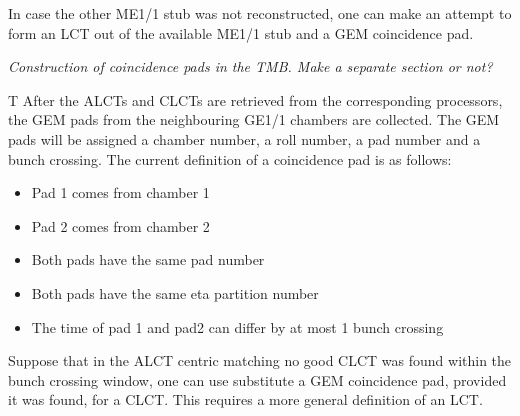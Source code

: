 In case the other ME1/1 stub was not reconstructed, one can make an attempt to form an LCT out of the available ME1/1 stub and a GEM coincidence pad.

\textit{Construction of coincidence pads in the TMB. Make a separate section or not?}


T
After the ALCTs and CLCTs are retrieved from the corresponding processors, the GEM pads from the neighbouring GE1/1 chambers are collected. The GEM pads will be assigned a chamber number, a roll number, a pad number and a bunch crossing. The current definition of a coincidence pad is as follows:
\begin{itemize}
\item Pad 1 comes from chamber 1
\item Pad 2 comes from chamber 2
\item Both pads have the same pad number
\item Both pads have the same eta partition number
\item The time of pad 1 and pad2 can differ by at most 1 bunch crossing
\end{itemize}


Suppose that in the ALCT centric matching no good CLCT was found within the bunch crossing window, one can use substitute a GEM coincidence pad, provided it was found, for a CLCT. This requires a more general definition of an LCT.  

%

%



